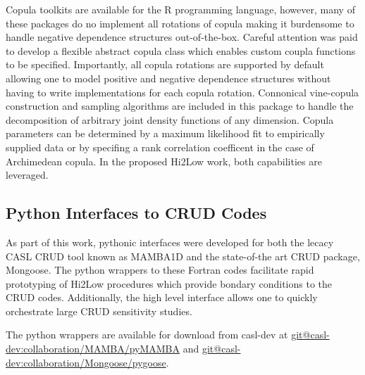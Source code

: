 Copula toolkits are available for the R programming language, however, many of these packages do no implement all rotations of copula making it burdensome to handle negative dependence structures out-of-the-box.  Careful attention was paid to develop a flexible abstract copula class which enables custom coupla functions to be specified.  Importantly, all copula rotations are supported by default allowing one to model positive and negative dependence structures without having to write implementations for each copula rotation.
Connonical vine-copula construction and sampling algorithms are included in this package to handle the decomposition of arbitrary joint density functions of any dimension.
Copula parameters can be determined by a maximum likelihood fit to empirically supplied data or by specifing a rank correlation coefficent in the case of Archimedean copula.  In the proposed Hi2Low work, both capabilities are leveraged.

\subsection{Python Interfaces to CRUD Codes}

As part of this work, pythonic interfaces were developed for both the lecacy CASL CRUD tool known as MAMBA1D and the state-of-the art CRUD package, Mongoose.  The python wrappers to these Fortran codes facilitate rapid prototyping of Hi2Low procedures which provide bondary conditions to the CRUD codes.  Additionally, the high level interface allows one to quickly orchestrate large CRUD sensitivity studies.

The python wrappers are available for download from casl-dev at \url{git@casl-dev:collaboration/MAMBA/pyMAMBA} and \url{git@casl-dev:collaboration/Mongoose/pygoose}.
